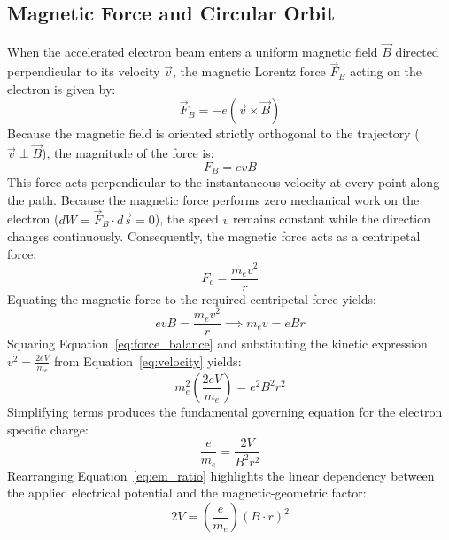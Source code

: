 \documentclass[journal]{IEEEtran}
\begin{document}
\subsection{Magnetic Force and Circular Orbit}
When the accelerated electron beam enters a uniform magnetic field $\vec{B}$ directed perpendicular to its velocity $\vec{v}$, the magnetic Lorentz force $\vec{F}_B$ acting on the electron is given by:
\begin{equation}
    \vec{F}_B = -e (\vec{v} \times \vec{B})
    \label{eq:lorentz}
\end{equation}
Because the magnetic field is oriented strictly orthogonal to the trajectory ($\vec{v} \perp \vec{B}$), the magnitude of the force is:
\begin{equation}
    F_B = e v B
\end{equation}
This force acts perpendicular to the instantaneous velocity at every point along the path. Because the magnetic force performs zero mechanical work on the electron ($d W = \vec{F}_B \cdot d\vec{s} = 0$), the speed $v$ remains constant while the direction changes continuously. Consequently, the magnetic force acts as a centripetal force:
\begin{equation}
    F_c = \frac{m_e v^2}{r}
    \label{eq:centripetal}
\end{equation}
Equating the magnetic force to the required centripetal force yields:
\begin{equation}
    e v B = \frac{m_e v^2}{r} \implies m_e v = e B r
    \label{eq:force_balance}
\end{equation}
Squaring Equation~\eqref{eq:force_balance} and substituting the kinetic expression $v^2 = \frac{2 e V}{m_e}$ from Equation~\eqref{eq:velocity} yields:
\begin{equation}
    m_e^2 \left(\frac{2 e V}{m_e}\right) = e^2 B^2 r^2
\end{equation}
Simplifying terms produces the fundamental governing equation for the electron specific charge:
\begin{equation}
    \frac{e}{m_e} = \frac{2 V}{B^2 r^2}
    \label{eq:em_ratio}
\end{equation}
Rearranging Equation~\eqref{eq:em_ratio} highlights the linear dependency between the applied electrical potential and the magnetic-geometric factor:
\begin{equation}
    2 V = \left(\frac{e}{m_e}\right) (B \cdot r)^2
    \label{eq:linear_relation}
\end{equation}
\end{document}
